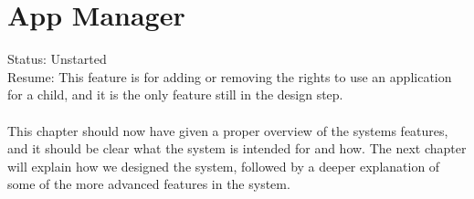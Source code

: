 \section{App Manager}
Status: Unstarted\\
Resume: This feature is for adding or removing the rights to use an application for a child, and it is the only feature still in the design step.\\
\\
This chapter should now have given a proper overview of the systems features, and it should be clear what the system is intended for and how. The next chapter will explain how we designed the system, followed by a deeper explanation of some of the more advanced features in the system.